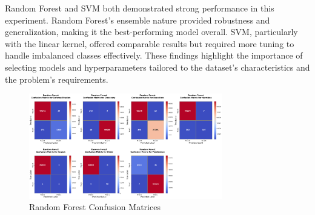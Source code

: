         Random Forest and SVM both demonstrated strong performance in this experiment. Random Forest's ensemble nature provided robustness and generalization, making it the best-performing model overall. SVM, particularly with the linear kernel, offered comparable results but required more tuning to handle imbalanced classes effectively. These findings highlight the importance of selecting models and hyperparameters tailored to the dataset's characteristics and the problem's requirements.     
        
        
        
        \clearpage

        
        \begin{figure}[H]
        
            \centering
            
            \begin{minipage}{\textwidth}
                \centering
                \begin{minipage}[c]{\textwidth}
                    \centering
                    \includegraphics[width=0.75\textwidth]{../figures/plots/section2/Random_Forest_confusion_matrices.png}
                    \caption{Random Forest Confusion Matrices}
                    \label{fig:}
                \end{minipage}%
            \end{minipage}

            \vspace{0.5cm}  %
            

\end{figure}
